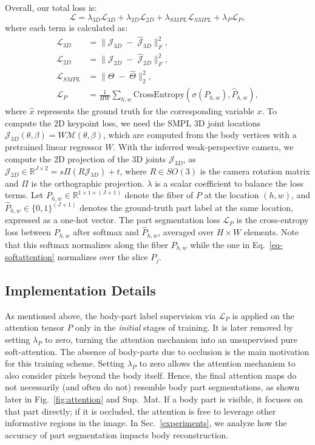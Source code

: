 \documentclass[10pt,twocolumn,letterpaper,usenames,dvipsnames]{article}
\newcommand{\supmat}{Sup.~Mat.\xspace}
\begin{document}
Overall, our total loss is: 
\begin{equation}
\mathcal{L} = \lambda_{3D}\mathcal{L}_{3D} + \lambda_{2D}\mathcal{L}_{2D} + \lambda_{SMPL} \mathcal{L}_{SMPL} + \lambda_P \mathcal{L}_{P},
\end{equation}
where each term is calculated as:
\begin{align*}
\mathcal{L}_{\mathit{3D}} &=   \| \mathcal{J}_{\mathit{3D}} \; - \; \hat{\mathcal{J}}_{\mathit{3D}} \|_F^2 , \\
\mathcal{L}_{\mathit{2D}} &=  \| \mathcal{J}_\mathit{2D} \; - \; \hat{\mathcal{J}}_\mathit{2D} \|_F^2 , \\
\mathcal{L}_{\mathit{SMPL}} &= \| \Theta \; - \; \hat{\Theta} \|_2^2, \\
\mathcal{L}_P &= \frac{1}{HW} \sum_{h,w} \text{CrossEntropy}\left(\sigma(P_{h,w}), \hat{P}_{h,w}\right),
\end{align*}
where $\hat{x}$ represents the ground truth for the corresponding variable $x$. 
To compute the 2D keypoint loss, we need the SMPL 3D joint locations $\mathcal{J}_\mathit{3D}(\theta, \beta) = W \mathcal{M}(\theta, \beta)$, which are computed from the body vertices with a pretrained linear regressor $W$.
With the inferred weak-perspective camera, we compute the 2D projection of the 3D joints $\mathcal{J}_\mathit{3D}$, as
$\mathcal{J}_\mathit{2D} \in \mathbb{R}^{J \times 2} = s\Pi(R\mathcal{J}_\mathit{3D}) + t $, where $R \in SO(3)$ is the camera rotation matrix and $\Pi$ is the orthographic projection. $\lambda$ is a scalar coefficient to balance the loss terms. 
Let $P_{h,w} \in \mathbb{R}^{1\times1 \times (J+1)}$ denote the fiber
of $P$ at the location $(h,w)$, 
and $\hat{P}_{h,w} \in \{0,1\}^{(J+1)}$ denotes the ground-truth part label at the same location, expressed as a one-hot vector.
The part segmentation loss $ \mathcal{L}_P$ is the cross-entropy loss between $P_{h,w}$ after softmax and $\hat{P}_{h,w}$, averaged over $H\times W$ elements. 
Note that this softmax normalizes along the fiber $P_{h,w}$ while the one in Eq.~\ref{eq-softattention} normalizes over the slice $P_j$.

\subsection{Implementation Details}
\label{sec:implementation}
As mentioned above, the body-part label supervision via $\mathcal{L}_P$ is applied on the attention tensor $P$ only in the \emph{initial} stages of training. 
It is later removed by setting $\lambda_P$ to zero, turning the attention mechanism into an unsupervised pure soft-attention. 
The absence of body-parts due to occlusion is the main motivation for this training scheme. 
Setting $\lambda_P$ to zero allows the attention mechanism to also consider pixels beyond the body itself. 
Hence, the final attention maps do not necessarily (and often do not) resemble body part segmentations, as shown later in Fig.~\ref{fig:attention} and \supmat
If a body part is visible, it focuses on that part directly; if it is occluded, the attention is free to leverage other informative regions in the image. 
In Sec.~\ref{experiments}, we analyze how the accuracy of part segmentation impacts body reconstruction.
\end{document}
